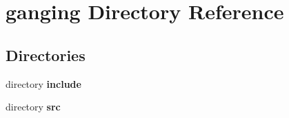 \section{ganging Directory Reference}
\label{dir_8e6db16cbd8d78a84d8324945585c9e0}
\subsection*{Directories}
\begin{DoxyCompactItemize}
\item 
directory {\bf include}
\item 
directory {\bf src}
\end{DoxyCompactItemize}
